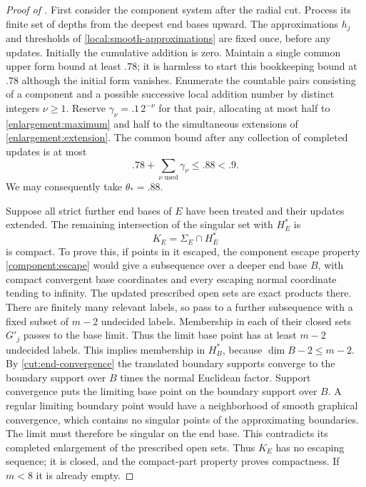 \begin{proof}[Proof of ]
First consider the component system after the radial cut.  Process its
finite set of depths from the deepest end bases upward.  The approximations $h_j$ and
thresholds of \cref{local:smooth-approximations} are fixed once, before any updates.
Initially the cumulative addition is zero.  Maintain a single common
upper form bound at least $.78$; it is harmless to start this bookkeeping
bound at $.78$ although the initial form vanishes.  Enumerate the
countable pairs consisting of a component and a possible successive local
addition number by distinct integers $\nu\ge1$.  Reserve
$\gamma_\nu=.1\,2^{-\nu}$ for that pair, allocating at most half to
\cref{enlargement:maximum} and half to the simultaneous extensions of
\cref{enlargement:extension}.  The common bound after any collection of
completed updates is at most
\[
 .78+\sum_{\nu\text{ used}}\gamma_\nu\le .88<.9.
\]
We may consequently take $\theta_*=.88$.

Suppose all strict further end bases of $E$ have been treated and their
updates extended.  The remaining intersection of the singular set with $H_E^*$ is
\[
 K_E=\Sigma_E\cap H_E^*
\]
is compact.  To prove this, if points in it escaped, the component escape
property \cref{component:escape} would give a subsequence over a deeper
end base $B$, with compact convergent base coordinates and every escaping
normal coordinate tending to infinity.  The updated prescribed open sets are exact
products there.  There are finitely many relevant labels, so pass to a further
subsequence with a fixed subset of $m-2$ undecided labels.
Membership in each of their closed sets $G'_j$ passes to the base
limit.  Thus the limit base point has at least $m-2$ undecided labels.
This implies membership in $H_B^*$, because
$\dim B-2\le m-2$.  By \cref{cut:end-convergence} the translated boundary supports converge to the boundary support over $B$ times the normal Euclidean
factor.  Support convergence puts the limiting base point on the boundary support over $B$.  A regular limiting boundary point would have a neighborhood
of smooth graphical convergence, which contains no singular points of
the approximating boundaries.  The limit must therefore be singular on the
end base.  This contradicts its completed enlargement of the prescribed open sets.  Thus $K_E$ has no
escaping sequence; it is closed, and the compact-part property proves
compactness.  If $m<8$ it is already empty.


\end{proof}
